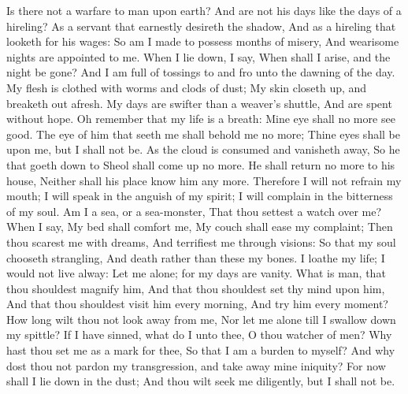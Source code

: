 Is there not a warfare to man upon earth? And are not his days like the days of a hireling?  As a servant that earnestly desireth the shadow, And as a hireling that looketh for his wages:  So am I made to possess months of misery, And wearisome nights are appointed to me.  When I lie down, I say, When shall I arise, and the night be gone? And I am full of tossings to and fro unto the dawning of the day.  My flesh is clothed with worms and clods of dust; My skin closeth up, and breaketh out afresh.  My days are swifter than a weaver’s shuttle, And are spent without hope.  Oh remember that my life is a breath: Mine eye shall no more see good.  The eye of him that seeth me shall behold me no more; Thine eyes shall be upon me, but I shall not be.  As the cloud is consumed and vanisheth away, So he that goeth down to Sheol shall come up no more.  He shall return no more to his house, Neither shall his place know him any more.  Therefore I will not refrain my mouth; I will speak in the anguish of my spirit; I will complain in the bitterness of my soul.  Am I a sea, or a sea-monster, That thou settest a watch over me?  When I say, My bed shall comfort me, My couch shall ease my complaint;  Then thou scarest me with dreams, And terrifiest me through visions:  So that my soul chooseth strangling, And death rather than these my bones.  I loathe my life; I would not live alway: Let me alone; for my days are vanity.  What is man, that thou shouldest magnify him, And that thou shouldest set thy mind upon him,  And that thou shouldest visit him every morning, And try him every moment?  How long wilt thou not look away from me, Nor let me alone till I swallow down my spittle?  If I have sinned, what do I unto thee, O thou watcher of men? Why hast thou set me as a mark for thee, So that I am a burden to myself?  And why dost thou not pardon my transgression, and take away mine iniquity? For now shall I lie down in the dust; And thou wilt seek me diligently, but I shall not be. 

